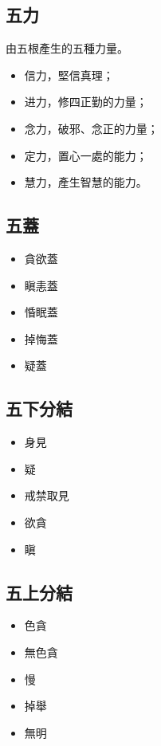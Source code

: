 \subsection{五力}
由五根產生的五種力量。
\begin{itemize}
  \item 信力，堅信真理；
  \item 进力，修四正勤的力量；
  \item 念力，破邪、念正的力量；
  \item 定力，置心一處的能力；
  \item 慧力，產生智慧的能力。
\end{itemize}

\subsection{五蓋}
\begin{itemize}
  \item 貪欲蓋
  \item 瞋恚蓋
  \item 惛眠蓋
  \item 掉悔蓋
  \item 疑蓋
\end{itemize}

\subsection{五下分結}
\begin{itemize}
  \item 身見
  \item 疑
  \item 戒禁取見
  \item 欲貪
  \item 瞋
\end{itemize}

\subsection{五上分結}
\begin{itemize}
  \item 色貪
  \item 無色貪
  \item 慢
  \item 掉舉
  \item 無明
\end{itemize}
